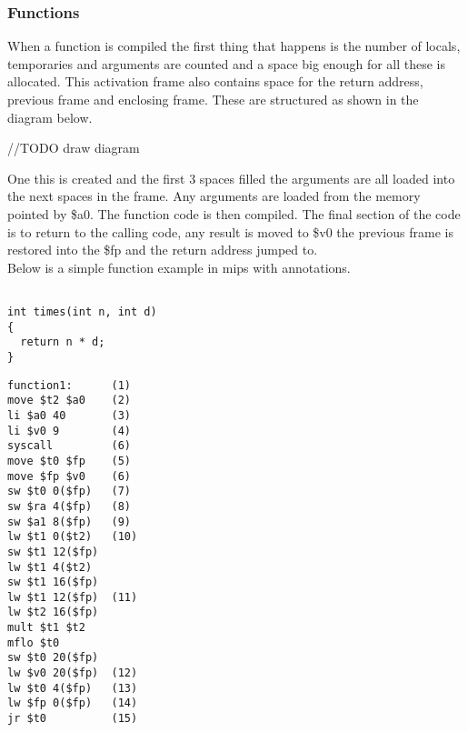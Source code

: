 \documentclass{article}
\begin{document}
\subsubsection{Functions}
When a function is compiled the first thing that happens is the number of locals,
temporaries and arguments are counted and a space big enough for all these is allocated.
This activation frame also contains space for the return address, previous frame
and enclosing frame. These are structured as shown in the diagram below.

//TODO draw diagram

One this is created and the first 3 spaces filled the arguments are all loaded
into the next spaces in the frame. Any arguments are loaded from the memory pointed
by \$a0. The function code is then compiled. The final
section of the code is to return to the calling code, any result is moved to \$v0
the previous frame is restored into the \$fp and the return address jumped to.\\
Below is a simple function example in mips with annotations.

\begin{minipage}{0.4\textwidth}
\begin{lstlisting}

int times(int n, int d)
{
  return n * d;
}

\end{lstlisting}
\end{minipage}%
\begin{minipage}{0.6\textwidth}
\begin{lstlisting}
function1:      (1)
move $t2 $a0    (2)
li $a0 40       (3)
li $v0 9        (4)
syscall         (6)
move $t0 $fp    (5)
move $fp $v0    (6)
sw $t0 0($fp)   (7)
sw $ra 4($fp)   (8)
sw $a1 8($fp)   (9)
lw $t1 0($t2)   (10)
sw $t1 12($fp)
lw $t1 4($t2)
sw $t1 16($fp)
lw $t1 12($fp)  (11)
lw $t2 16($fp)
mult $t1 $t2
mflo $t0
sw $t0 20($fp)
lw $v0 20($fp)  (12)
lw $t0 4($fp)   (13)
lw $fp 0($fp)   (14)
jr $t0          (15)
\end{lstlisting}
\end{minipage}%
\end{document}
